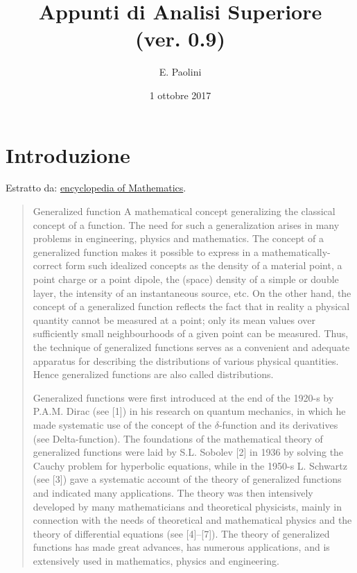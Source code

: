 \documentclass[italian,a4paper,oneside,headinclude]{scrbook}
\title{Appunti di Analisi Superiore\\(ver. 0.9)}
\author{E. Paolini}
\date{1 ottobre 2017}
\begin{document}
\maketitle

\tableofcontents

\chapter{Introduzione}

Estratto da: \href{https://www.encyclopediaofmath.org/index.php/Generalized_function}{encyclopedia of Mathematics}.

\begin{quote}
Generalized function
A mathematical concept generalizing the classical concept of a
function. The need for such a generalization arises in many problems
in engineering, physics and mathematics. The concept of a generalized
function makes it possible to express in a mathematically-correct form
such idealized concepts as the density of a material point, a point
charge or a point dipole, the (space) density of a simple or double
layer, the intensity of an instantaneous source, etc. On the other
hand, the concept of a generalized function reflects the fact that in
reality a physical quantity cannot be measured at a point; only its
mean values over sufficiently small neighbourhoods of a given point
can be measured. Thus, the technique of generalized functions serves
as a convenient and adequate apparatus for describing the
distributions of various physical quantities. Hence generalized
functions are also called distributions.

Generalized functions were first introduced at the end of the 1920-s
by P.A.M. Dirac (see [1]) in his research on quantum mechanics, in
which he made systematic use of the concept of the $\delta$-function and its
derivatives (see Delta-function). The foundations of the mathematical
theory of generalized functions were laid by S.L. Sobolev [2] in 1936
by solving the Cauchy problem for hyperbolic equations, while in the
1950-s L. Schwartz (see [3]) gave a systematic account of the theory
of generalized functions and indicated many applications. The theory
was then intensively developed by many mathematicians and theoretical
physicists, mainly in connection with the needs of theoretical and
mathematical physics and the theory of differential equations (see
[4]–[7]). The theory of generalized functions has made great advances,
has numerous applications, and is extensively used in mathematics,
physics and engineering.
\end{quote}
\end{document}
